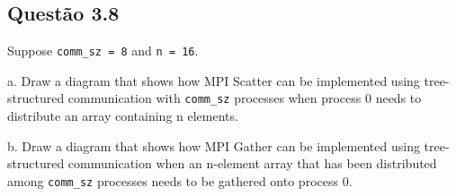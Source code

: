

\subsection{Questão 3.8}

Suppose \texttt{comm\_sz = 8} and \texttt{n = 16}.

a. Draw a diagram that shows how MPI Scatter can be implemented using
tree-structured communication with \texttt{comm\_sz} processes when process 0 needs to distribute an array containing n elements.

b. Draw a diagram that shows how MPI Gather can be implemented using
tree-structured communication when an n-element array that has been distributed among \texttt{comm\_sz} processes needs to be gathered onto process 0.\\


